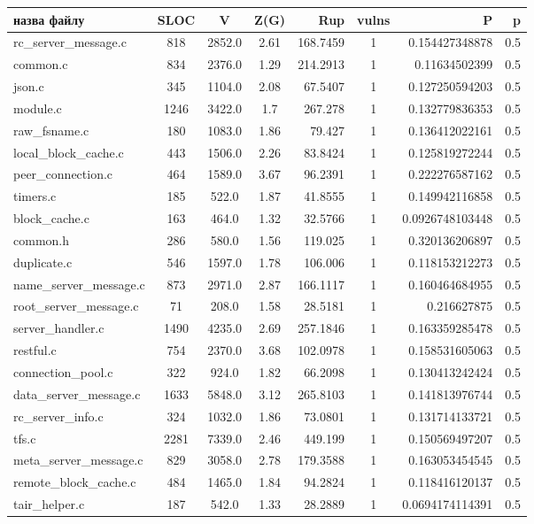 \begin{center}
  \begin{tabular}{
  |l|c|c|c|n{3}{2}|c|n{2}{2}|n{2}{2}|
  }
  \hline 
  назва файлу &  
  SLOC & 
  \parbox[t]{1cm}{V} & 
  \parbox[t]{1cm}{Z(G)} & 
  Rup & 
  vulns & 
  P & 
  p\\
  
  \hline rc\_server\_message.c & 818 & 2852.0 & 2.61 & 168.7459 & 1 & 0.154427348878 & 0.5\\
  \hline common.c & 834 & 2376.0 & 1.29 & 214.2913 & 1 & 0.11634502399 & 0.5\\
  \hline json.c & 345 & 1104.0 & 2.08 & 67.5407 & 1 & 0.127250594203 & 0.5\\
  \hline module.c & 1246 & 3422.0 & 1.7 & 267.278 & 1 & 0.132779836353 & 0.5\\
  \hline raw\_fsname.c & 180 & 1083.0 & 1.86 & 79.427 & 1 & 0.136412022161 & 0.5\\
  \hline local\_block\_cache.c & 443 & 1506.0 & 2.26 & 83.8424 & 1 & 0.125819272244 & 0.5\\
  \hline peer\_connection.c & 464 & 1589.0 & 3.67 & 96.2391 & 1 & 0.222276587162 & 0.5\\
  \hline timers.c & 185 & 522.0 & 1.87 & 41.8555 & 1 & 0.149942116858 & 0.5\\
  \hline block\_cache.c & 163 & 464.0 & 1.32 & 32.5766 & 1 & 0.0926748103448 & 0.5\\
  \hline common.h & 286 & 580.0 & 1.56 & 119.025 & 1 & 0.320136206897 & 0.5\\
  \hline duplicate.c & 546 & 1597.0 & 1.78 & 106.006 & 1 & 0.118153212273 & 0.5\\
  \hline name\_server\_message.c & 873 & 2971.0 & 2.87 & 166.1117 & 1 & 0.160464684955 & 0.5\\
  \hline root\_server\_message.c & 71 & 208.0 & 1.58 & 28.5181 & 1 & 0.216627875 & 0.5\\
  \hline server\_handler.c & 1490 & 4235.0 & 2.69 & 257.1846 & 1 & 0.163359285478 & 0.5\\
  \hline restful.c & 754 & 2370.0 & 3.68 & 102.0978 & 1 & 0.158531605063 & 0.5\\
  \hline connection\_pool.c & 322 & 924.0 & 1.82 & 66.2098 & 1 & 0.130413242424 & 0.5\\
  \hline data\_server\_message.c & 1633 & 5848.0 & 3.12 & 265.8103 & 1 & 0.141813976744 & 0.5\\
  \hline rc\_server\_info.c & 324 & 1032.0 & 1.86 & 73.0801 & 1 & 0.131714133721 & 0.5\\
  \hline tfs.c & 2281 & 7339.0 & 2.46 & 449.199 & 1 & 0.150569497207 & 0.5\\
  \hline meta\_server\_message.c & 829 & 3058.0 & 2.78 & 179.3588 & 1 & 0.163053454545 & 0.5\\
  \hline remote\_block\_cache.c & 484 & 1465.0 & 1.84 & 94.2824 & 1 & 0.118416120137 & 0.5\\
  \hline tair\_helper.c & 187 & 542.0 & 1.33 & 28.2889 & 1 & 0.0694174114391 & 0.5\\
  \hline 
 \end{tabular}
\end{center}
\npnoround

